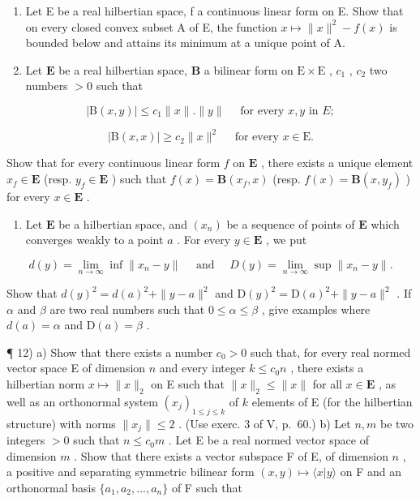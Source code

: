 \begin{enumerate}
\def\labelenumi{\arabic{enumi})}
\setcounter{enumi}{8}
\item
  Let E be a real hilbertian space, f a continuous linear form on E. Show that on every closed convex subset A of E, the function \(x \mapsto \|x\|^{2} - f(x)\) is bounded below and attains its minimum at a unique point of A.
\item
  Let \(\mathbf{E}\) be a real hilbertian space, \(\mathbf{B}\) a bilinear form on \(\mathrm{E} \times \mathrm{E}\) , \(c_{1}\) , \(c_{2}\) two numbers \(> 0\) such that
\end{enumerate}

\[
\left| \mathrm{B} (x, y) \right| \leqslant c _ {1} \| x \|. \| y \| \quad \text { for   every } x, y \text { in } E;
\]

\[
\left| \mathrm{B} (x, x) \right| \geqslant c _ {2} \| x \| ^ {2} \quad \text {   for   every   } x \in \mathrm{E}.
\]

Show that for every continuous linear form \(f\) on \(\mathbf{E}\) , there exists a unique element \(x_{f} \in \mathbf{E}\) (resp. \(y_{f} \in \mathbf{E}\) ) such that \(f(x) = \mathbf{B}(x_{f}, x)\) (resp. \(f(x) = \mathbf{B}(x, y_{f})\) ) for every \(x \in \mathbf{E}\) .

\begin{enumerate}
\def\labelenumi{\arabic{enumi})}
\setcounter{enumi}{10}
\tightlist
\item
  Let \(\mathbf{E}\) be a hilbertian space, and \((x_{n})\) be a sequence of points of \(\mathbf{E}\) which converges weakly to a point \(a\) . For every \(y \in \mathbf{E}\) , we put
\end{enumerate}

\[
d (y) = \lim _ {n \rightarrow \infty} \inf \| x _ {n} - y \| \quad \text { and } \quad D (y) = \lim _ {n \rightarrow \infty} \sup \| x _ {n} - y \|.
\]

Show that \(d(y)^2 = d(a)^2 + \| y - a\|^2\) and \(\mathrm{D}(y)^2 = \mathrm{D}(a)^2 + \| y - a\|^2\) . If \(\alpha\) and \(\beta\) are two real numbers such that \(0 \leqslant \alpha \leqslant \beta\) , give examples where \(d(a) = \alpha\) and \(\mathrm{D}(a) = \beta\) .

¶ 12) a) Show that there exists a number \(c_{0} > 0\) such that, for every real normed vector space E of dimension \(n\) and every integer \(k \leqslant c_{0} n\) , there exists a hilbertian norm \(x \mapsto \| x \|_{2}\) on E such that \(\| x \|_{2} \leqslant \| x \|\) for all \(x \in \mathbf{E}\) , as well as an orthonormal system \((x_{j})_{1 \leqslant j \leqslant k}\) of \(k\) elements of E (for the hilbertian structure) with norms \(\| x_{j} \| \leqslant 2\) . (Use exerc. 3 of V, p.~60.) b) Let \(n, m\) be two integers \(> 0\) such that \(n \leqslant c_{0} m\) . Let E be a real normed vector space of dimension \(m\) . Show that there exists a vector subspace F of E, of dimension \(n\) , a positive and separating symmetric bilinear form \((x, y) \mapsto \langle x | y \rangle\) on F and an orthonormal basis \(\{a_{1}, a_{2}, ..., a_{n}\}\) of F such that

